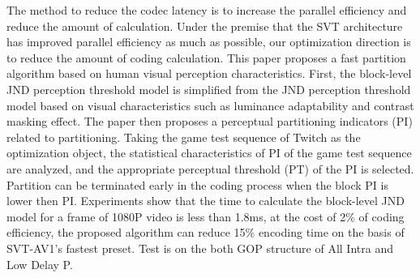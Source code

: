 \begin{enabstract}
  The method to reduce the codec latency is to increase the parallel efficiency and reduce the amount of calculation. Under the premise that the SVT architecture has improved parallel efficiency as much as possible, our optimization direction is to reduce the amount of coding calculation. This paper proposes a fast partition algorithm based on human visual perception characteristics. First, the block-level JND perception threshold model is simplified from the JND perception threshold model based on visual characteristics such as luminance adaptability and contrast masking effect. The paper then proposes a perceptual partitioning indicators (PI) related to partitioning. Taking the game test sequence of Twitch as the optimization object, the statistical characteristics of PI of the game test sequence are analyzed, and the appropriate perceptual threshold (PT) of the PI is selected. Partition can be  terminated early in the coding process when the block PI is lower then PI. Experiments show that the time to calculate the block-level JND model for a frame of 1080P video is less than 1.8ms, at the cost of 2\% of coding efficiency, the proposed algorithm can reduce 15\% encoding time on the basis of SVT-AV1's fastest preset. Test is on the both GOP structure of All Intra and Low Delay P.
\end{enabstract}
